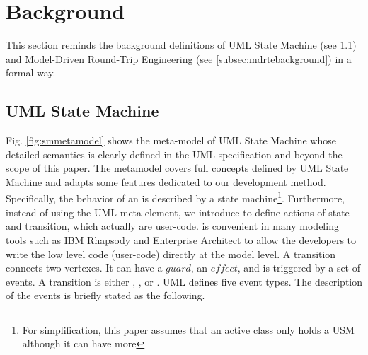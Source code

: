 \section{Background}
\label{sec:background}
This section reminds the background definitions of UML State Machine (see \ref{subsec:usmbackground}) and Model-Driven Round-Trip Engineering (see \ref{subsec:mdrtebackground}) in a formal way.


\subsection{UML State Machine}
\label{subsec:usmbackground}

 Fig. \ref{fig:smmetamodel} shows the meta-model of UML State Machine whose detailed semantics is clearly defined in the UML specification \cite{OMG2015} and beyond the scope of this paper.
The metamodel covers full concepts defined by UML State Machine and adapts some features dedicated to our development method.
Specifically, the behavior of an  is described by a state machine\footnote{%
	For simplification, this paper assumes that an active class only holds a USM although it can have more}.
Furthermore, instead of using the  UML meta-element, we introduce  to define actions of state and transition, which actually are user-code.
 is convenient in many modeling tools such as IBM Rhapsody and Enterprise Architect to allow the developers to write the low level code (user-code) directly at the model level.
A transition connects two vertexes.%
It can have a $guard$, an $effect$, and is triggered by a set of events. 
A transition 
is either , , or . %
UML defines five event types. 
The description of the events is briefly stated as the following.


